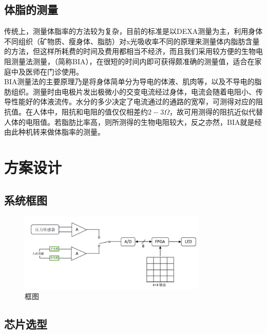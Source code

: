 \documentclass[16pt,a4paper]{article}
\begin{document}
\subsection{体脂的测量}
传统上，测量体脂率的方法较为复杂，目前的标准是以DEXA测量为主，利用身体不同组织（矿物质、瘦身体、脂肪）对x光吸收率不同的原理来测量体内脂肪含量的方法，但这样所耗费的时间及费用都相当不经济，而且我们采用较方便的生物电阻测量法测量，（简称BIA），在很短的时间内即可获得颇准确的测量值，适合在家庭中及医师在门诊使用。 \\
BIA测量法的主要原理乃是将身体简单分为导电的体液、肌肉等，以及不导电的脂肪组织。测量时由电极片发出极微小的交变电流经过身体，电流会随着电阻小、传导性能好的体液流传。水分的多少决定了电流通过的通路的宽窄，可测得对应的阻抗值。在人体中，阻抗和电阻的值仅仅相差约$2-3\Omega$，故可用测得的阻抗近似代替人体的电阻值。若脂肪比率高，则所测得的生物电阻较大，反之亦然，BIA就是经由此种机转来做体脂率的测量。

\section{方案设计}
\subsection{系统框图}
\begin{figure}[H]
\centering
\includegraphics[width=0.8\textwidth]{框图.png}
\caption{框图}
\end{figure}
\subsection{芯片选型}
\end{document}
